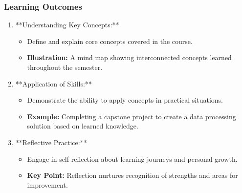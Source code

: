 \documentclass[aspectratio=169]{beamer}
\begin{document}
\begin{frame}[fragile]
    \frametitle{Learning Outcomes}
    \begin{enumerate}
        \item **Understanding Key Concepts:**
        \begin{itemize}
            \item Define and explain core concepts covered in the course.
            \item \textbf{Illustration:} A mind map showing interconnected concepts learned throughout the semester.
        \end{itemize}

        \item **Application of Skills:**
        \begin{itemize}
            \item Demonstrate the ability to apply concepts in practical situations.
            \item \textbf{Example:} Completing a capstone project to create a data processing solution based on learned knowledge.
        \end{itemize}

        \item **Reflective Practice:**
        \begin{itemize}
            \item Engage in self-reflection about learning journeys and personal growth.
            \item \textbf{Key Point:} Reflection nurtures recognition of strengths and areas for improvement.
        \end{itemize}
    \end{enumerate}
\end{frame}
\end{document}
